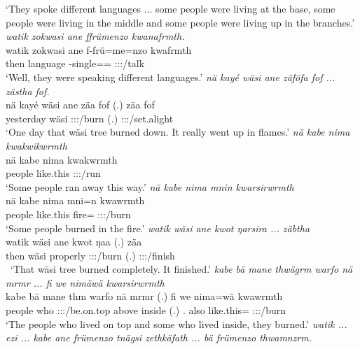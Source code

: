 \begin{exe}
	\trans `They spoke different languages ... some people were living at the base, some people were living in the middle and some people were living up in the branches.'
	\emph{watik zokwasi ane ffrümenzo kwanafrmth.}\\
	\gll watik zokwasi ane f-frü=me=nzo kwafrmth\\ 
	then language \Dem{} \Redup-single=\Ins=\Only{} \Stpl:\Sbj:\Pst:\Dur/talk\\
	\trans `Well, they were speaking different languages.'
	\emph{nä kayé wäsi ane zäföfa fof ... zästha fof.}\\
	\gll nä kayé wäsi ane zäa fof (.) zäa fof\\ 
	\Indf{} yesterday wäsi \Dem{} \Sg:\Sbj:\Pst:\Ipfv/burn \Emph{} (.) \Sg:\Sbj:\Pst:\Pfv/set.alight \Emph{}\\
	\trans `One day that wäsi tree burned down. It really went up in flames.'
	\emph{nä kabe nima kwakwikwrmth}\\
	\gll nä kabe nima kwakwrmth\\ 
	\Indf{} people like.this \Stpl:\Sbj:\Pst:\Dur/run\\
	\trans `Some people ran away this way.'
	\emph{nä kabe nima mnin kwarsirwrmth}\\
	\gll nä kabe nima mni=n kwawrmth\\ 
	\Indf{} people like.this fire=\Loc{} \Stpl:\Sbj:\Pst:\Dur/burn\\
	\trans `Some people burned in the fire.'
	\emph{watik wäsi ane kwot ŋarsira ... zäbtha}\\
	\gll watik wäsi ane kwot ŋaa (.) zäa\\ 
	then wäsi \Dem{} properly \Sg:\Sbj:\Pst:\Ipfv/burn (.) \Sg:\Sbj:\Pst:\Pfv/finish\\\
	\trans `That wäsi tree burned completely. It finished.'
	\emph{kabe bä mane thwägrm warfo nä mrmr ... fi we nimäwä kwarsirwrmth}\\
	\gll kabe bä mane th\stem{wägr}m warfo nä mrmr (.) fi we nima=wä kwawrmth\\ 
	people \Med{} who \Stpl:\Sbj:\Pst:\Dur/be.on.top above \Indf{} inside (.) \Third.\Abs{} also like.this=\Emph{} \Stpl:\Sbj:\Pst:\Dur/burn\\
	\trans `The people who lived on top and some who lived inside, they burned.'
\exi{27} 
	\emph{watik ... ezi ... kabe ane frümenzo tnägsi zethkäfath ... bä frümenzo thwamnzrm.}\\

\end{exe}
